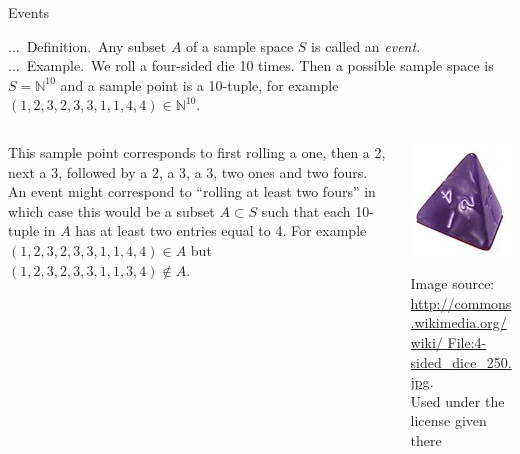 \documentclass[smaller,hyperref={CJKbookmarks=true}]{beamer}
\newcommand{\N}{\mathbb{N}} \newcommand{\Z}{\mathbb{Z}} \newcommand{\Q}{\mathbb{Q}}
\newcounter{zhuo}[subsection]
\renewcommand{\thezhuo}{\thesection.\thesubsection.\arabic{zhuo}}
\newenvironment{DEFINITION}{\stepcounter{zhuo}\alert{\thezhuo.~Definition.\,}}{}
\newenvironment{EXAMPLE}{\stepcounter{zhuo}\alert{\!\thezhuo.~Example.\,}}{}
\begin{document}
\begin{frame}[t]{Events}
\begin{spacing}{1.1}
\begin{DEFINITION}
Any subset $A$ of a sample space $S$ is called an \emph{event}.\\[6pt]
\end{DEFINITION}
\begin{EXAMPLE}
We roll a four-sided die 10 times. Then a possible sample space is $S=\N^{10}$ and a sample point is a 10-tuple, for example $(1,2,3,2,3,3,1,1,4,4)\in\N^{10}$.
\begin{columns}[onlytextwidth]
\begin{column}{0.7\textwidth}
This sample point corresponds to first rolling a one, then a 2, next a 3, followed by a 2, a 3, a 3, two ones and two fours.\\[6pt]
An event might correspond to ``rolling at least two fours'' in which case this would be a sub\-set $A\subset S$ such that each 10-tuple in $A$ has at least  two entries equal to 4. For example $(1,2,3,2,3,3,1,1,4,4)\in A$ but $(1,2,3,2,3,3,1,1,3,4)\notin A$.
\end{column}
\begin{column}{0.3\textwidth}
\begin{spacing}{0.5}
\includegraphics[width=\columnwidth]{die.jpg}\\
\begin{tiny}
  Image source:\\
\url{http://commons.wikimedia.org/wiki/
File:4-sided_dice_250.jpg}.\\
Used under the license given there
\end{tiny}
\end{spacing}
\end{column}
\end{columns}
\end{EXAMPLE}
\end{spacing}
\end{frame}
\end{document}
